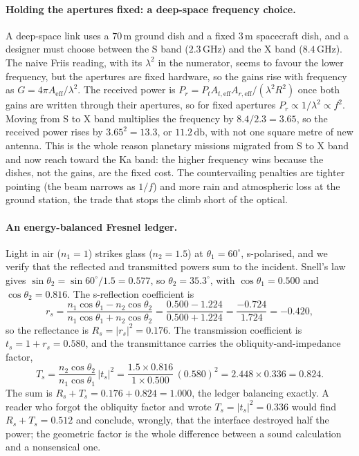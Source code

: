 \paragraph{Holding the apertures fixed: a deep-space frequency choice.}
A deep-space link uses a $70\,\si{\meter}$ ground dish and a fixed
$3\,\si{\meter}$ spacecraft dish, and a designer must choose between the
S band ($2.3\,\si{\giga\hertz}$) and the X band ($8.4\,\si{\giga\hertz}$).
The naive Friis reading, with its $\lambda^2$ in the numerator, seems to
favour the lower frequency, but the apertures are fixed hardware, so the
gains rise with frequency as $G = 4\pi A_{\text{eff}}/\lambda^2$. The
received power is $P_r = P_t A_{t,\text{eff}} A_{r,\text{eff}}/(\lambda^2
R^2)$ once both gains are written through their apertures, so for fixed
apertures $P_r\propto 1/\lambda^2 \propto f^2$. Moving from S to X band
multiplies the frequency by $8.4/2.3 = 3.65$, so the received power rises
by $3.65^2 = 13.3$, or $11.2\,\si{\decibel}$, with not one square metre of
new antenna. This is the whole reason planetary missions migrated from S
to X band and now reach toward the Ka band: the higher frequency wins
because the dishes, not the gains, are the fixed cost. The countervailing
penalties are tighter pointing (the beam narrows as $1/f$) and more rain
and atmospheric loss at the ground station, the trade that stops the climb
short of the optical.

\paragraph{An energy-balanced Fresnel ledger.}
Light in air ($n_1 = 1$) strikes glass ($n_2 = 1.5$) at $\theta_1 =
60^{\circ}$, s-polarised, and we verify that the reflected and
transmitted powers sum to the incident. Snell's law gives $\sin\theta_2 =
\sin 60^{\circ}/1.5 = 0.577$, so $\theta_2 = 35.3^{\circ}$, with
$\cos\theta_1 = 0.500$ and $\cos\theta_2 = 0.816$. The s-reflection
coefficient is
\[
r_s = \frac{n_1\cos\theta_1 - n_2\cos\theta_2}{n_1\cos\theta_1 +
n_2\cos\theta_2} = \frac{0.500 - 1.224}{0.500 + 1.224} = \frac{-0.724}
{1.724} = -0.420,
\]
so the reflectance is $R_s = |r_s|^2 = 0.176$. The transmission
coefficient is $t_s = 1 + r_s = 0.580$, and the transmittance carries the
obliquity-and-impedance factor,
\[
T_s = \frac{n_2\cos\theta_2}{n_1\cos\theta_1}\,|t_s|^2 = \frac{1.5\times
0.816}{1\times 0.500}\,(0.580)^2 = 2.448\times 0.336 = 0.824.
\]
The sum is $R_s + T_s = 0.176 + 0.824 = 1.000$, the ledger balancing
exactly. A reader who forgot the obliquity factor and wrote $T_s =
|t_s|^2 = 0.336$ would find $R_s + T_s = 0.512$ and conclude, wrongly,
that the interface destroyed half the power; the geometric factor is the
whole difference between a sound calculation and a nonsensical one.

